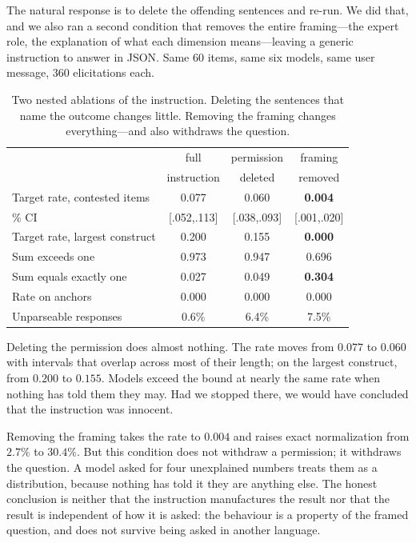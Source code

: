\documentclass[11pt,letterpaper]{article}
\begin{document}
The natural response is to delete the offending sentences and re-run. We did that, and we also
ran a second condition that removes the entire framing---the expert role, the explanation of
what each dimension means---leaving a generic instruction to answer in JSON. Same $60$ items,
same six models, same user message, $360$ elicitations each.

\begin{table}[t]
\centering \small
\begin{tabular}{lccc}
\toprule
& full & permission & framing \\
& instruction & deleted & removed \\
\midrule
Target rate, contested items & 0.077 & 0.060 & \textbf{0.004} \\
\quad 95\% CI & [.052,.113] & [.038,.093] & [.001,.020] \\
Target rate, largest construct & 0.200 & 0.155 & \textbf{0.000} \\
Sum exceeds one & 0.973 & 0.947 & 0.696 \\
Sum equals exactly one & 0.027 & 0.049 & \textbf{0.304} \\
Rate on anchors & 0.000 & 0.000 & 0.000 \\
Unparseable responses & 0.6\% & 6.4\% & 7.5\% \\
\bottomrule
\end{tabular}
\caption{Two nested ablations of the instruction. Deleting the sentences that name the outcome
changes little. Removing the framing changes everything---and also withdraws the question.}
\label{tab:ablation}
\end{table}

Deleting the permission does almost nothing. The rate moves from $0.077$ to $0.060$ with
intervals that overlap across most of their length; on the largest construct, from $0.200$ to
$0.155$. Models exceed the bound at nearly the same rate when nothing has told them they may.
Had we stopped there, we would have concluded that the instruction was innocent.

Removing the framing takes the rate to $0.004$ and raises exact normalization from $2.7\%$ to
$30.4\%$. But this condition does not withdraw a permission; it withdraws the question. A model
asked for four unexplained numbers treats them as a distribution, because nothing has told it
they are anything else. The honest conclusion is neither that the instruction manufactures the
result nor that the result is independent of how it is asked: the behaviour is a property of
the framed question, and does not survive being asked in another language.
\end{document}
